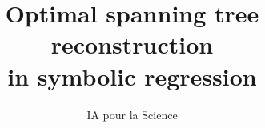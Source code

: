\documentclass[12pt]{article}
\begin{document}
\title{Optimal spanning tree reconstruction \\in symbolic regression}
\author{IA pour la Science}
\maketitle


%
%
%
%
\end{document}

